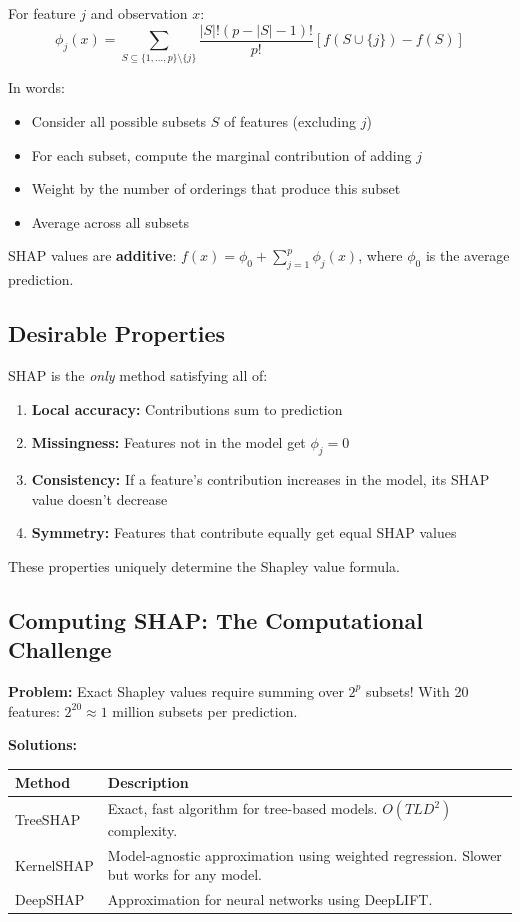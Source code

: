 \documentclass[11pt,a4paper]{article}
\newcommand{\keyword}[1]{\textbf{\textcolor{AccentOrange}{#1}}}
\begin{document}
For feature $j$ and observation $x$:
\[
\phi_j(x) = \sum_{S \subseteq \{1,\ldots,p\} \setminus \{j\}} \frac{|S|!(p-|S|-1)!}{p!} \left[ f(S \cup \{j\}) - f(S) \right]
\]

In words:
\begin{itemize}
    \item Consider all possible subsets $S$ of features (excluding $j$)
    \item For each subset, compute the marginal contribution of adding $j$
    \item Weight by the number of orderings that produce this subset
    \item Average across all subsets
\end{itemize}

SHAP values are \keyword{additive}: $f(x) = \phi_0 + \sum_{j=1}^{p} \phi_j(x)$, where $\phi_0$ is the average prediction.

\subsection{Desirable Properties}

SHAP is the \emph{only} method satisfying all of:

\begin{enumerate}
    \item \textbf{Local accuracy:} Contributions sum to prediction
    \item \textbf{Missingness:} Features not in the model get $\phi_j = 0$
    \item \textbf{Consistency:} If a feature's contribution increases in the model, its SHAP value doesn't decrease
    \item \textbf{Symmetry:} Features that contribute equally get equal SHAP values
\end{enumerate}

These properties uniquely determine the Shapley value formula.

\subsection{Computing SHAP: The Computational Challenge}

\textbf{Problem:} Exact Shapley values require summing over $2^p$ subsets! With 20 features: $2^{20} \approx 1$ million subsets per prediction.

\textbf{Solutions:}

\begin{center}
\begin{tabular}{lp{7cm}}
    \toprule
    \textbf{Method} & \textbf{Description} \\
    \midrule
    TreeSHAP & Exact, fast algorithm for tree-based models. $O(TLD^2)$ complexity. \\
    KernelSHAP & Model-agnostic approximation using weighted regression. Slower but works for any model. \\
    DeepSHAP & Approximation for neural networks using DeepLIFT. \\
    \bottomrule
\end{tabular}
\end{center}
\end{document}

